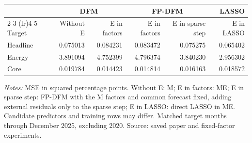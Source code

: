\begin{threeparttable}
\begin{tabular}{@{}lrrrrr@{}}
\toprule
 & \multicolumn{2}{c}{DFM} & \multicolumn{2}{c}{FP-DFM} & LASSO \\
\cmidrule(lr){2-3} \cmidrule(lr){4-5}
Target & Without E & E in factors & E in factors & E in sparse step & E in LASSO \\
\midrule
Headline & 0.075013 & 0.084231 & 0.083472 & 0.075275 & 0.065402 \\
Energy & 3.891094 & 4.752399 & 4.796374 & 3.840230 & 2.956302 \\
Core & 0.019784 & 0.014423 & 0.014814 & 0.016163 & 0.018572 \\
\bottomrule
\end{tabular}
\begin{tablenotes}[flushleft]\footnotesize
\item \textit{Notes:} MSE in squared percentage points. Without E: M; E in factors: ME; E in sparse step: FP-DFM with the M factors and common forecast fixed, adding external residuals only to the sparse step; E in LASSO: direct LASSO in ME. Candidate predictors and training rows may differ. Matched target months through December 2025, excluding 2020. Source: saved paper and fixed-factor experiments.
\end{tablenotes}
\end{threeparttable}
